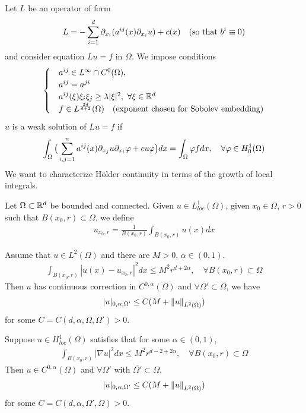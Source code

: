 \documentclass[10pt,a4paper]{article}
\begin{document}
Let $L$ be an operator of form
\begin{align*}
L = -\sum_{i=1}^d \partial_{x_i}(a^{ij}(x) \partial_{x_i} u) + c(x) \quad (\text{so that } b^i \equiv 0)
\end{align*}
and consider equation $Lu = f$ in $\Omega$. We impose conditions
\begin{align*}
\begin{cases}
& a^{ij} \in L^{\infty} \cap C^0(\Omega),\\
& a^{ij}= a^{ji} \\
& a^{ij}(\xi)\xi_i \xi_j \geq \lambda |\xi|^2, \,\, \forall \xi \in \mathbb{R}^d \\
& f\in L^{\frac{2d}{d+2}}(\Omega) \quad (\text{exponent chosen for Sobolev embedding})
\end{cases}
\end{align*}
$u$ is a weak solution of $Lu =f$ if
\begin{align*}
\int_{\Omega} \big( \sum_{i,j=1}^n a^{ij}(x) \partial_{x_j} u \partial_{x_i} \varphi + cu\varphi \big) dx = \int_{\Omega} \varphi f dx, \quad \forall \varphi \in H_0^1(\Omega)
\end{align*}
We want to characterize H\"older continuity in terms of the growth of local integrals.
\s

Let $\Omega \subset \mathbb{R}^d$ be bounded and connected. Given $u\in L^1_{loc}(\Omega)$, given $x_0 \in \Omega$, $r>0$ such that $B(x_0, r) \subset \Omega$, we define
\begin{align*}
u_{x_0, r} = \frac{1}{B(x_0, r)}\int_{B(x_0, r)} u(x) dx
\end{align*}
\s

\thm Assume that $u\in L^2(\Omega)$ and there are $M>0$, $\alpha \in (0,1)$.
\begin{align*}
\int_{B(x_0, r)} |u (x) - u_{x_0, r}|^2 dx \leq M^2 r^{d+ 2\alpha}, \quad \forall B(x_0,r) \subset \Omega
\end{align*}
Then $u$ has continuous correction in $C^{0, \alpha}(\Omega)$ and $\forall \bar{\Omega'} \subset \Omega$, we have 
\begin{align*}
|u|_{0, \alpha, \Omega'} \leq C(M + \snorms{u}{L^2(\Omega)})
\end{align*}
for some $C= C(d, \alpha, \Omega, \Omega') >0$.
\s

\corr Suppose $u\in H^1_{loc} (\Omega)$ satisfies that for some $\alpha \in (0,1)$,
\begin{align*}
\int_{B(x_0, r)} |\nabla u|^2 dx \leq M^2 r^{d-2 + 2\alpha}, \quad \forall B(x_0, r) \subset \Omega
\end{align*}
Then $u\in C^{0, \alpha}(\Omega)$ and $\forall \Omega'$ with $\bar{\Omega'} \subset \Omega$,
\begin{align*}
|u|_{0, \alpha, \Omega'} \leq C(M + \snorms{u}{L^2(\Omega)})
\end{align*}
for some $C = C(d, \alpha, \Omega', \Omega) >0$.
\s
\end{document}
